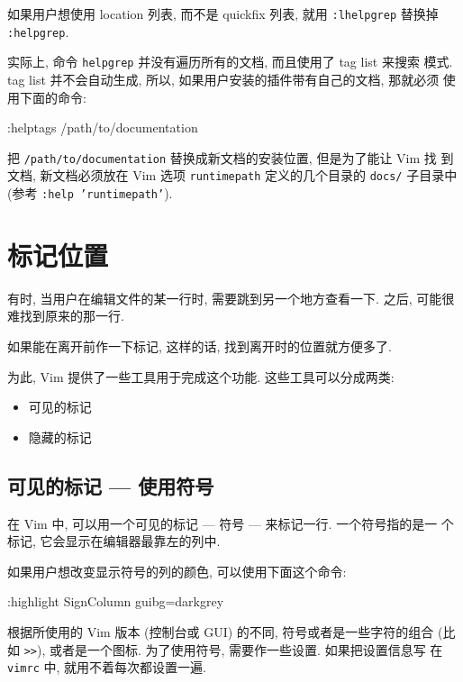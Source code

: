 \begin{warning}
    如果用户想使用 location 列表, 而不是 quickfix 列表, 就用 \texttt{:lhelpgrep}
    替换掉 \texttt{:helpgrep}.
\end{warning}

实际上, 命令 \texttt{helpgrep} 并没有遍历所有的文档, 而且使用了 tag list 来搜索
模式. tag list 并不会自动生成, 所以, 如果用户安装的插件带有自己的文档, 那就必须
使用下面的命令:
\begin{vimcode}
    :helptags /path/to/documentation
\end{vimcode}
把 \texttt{/path/to/documentation} 替换成新文档的安装位置, 但是为了能让 Vim 找
到文档, 新文档必须放在 Vim 选项 \texttt{runtimepath} 定义的几个目录的
\texttt{docs/} 子目录中 (参考 \texttt{:help 'runtimepath'}).

\section{标记位置}
\label{sec:x_marks_the_spot}

有时, 当用户在编辑文件的某一行时, 需要跳到另一个地方查看一下. 之后, 可能很
难找到原来的那一行.

如果能在离开前作一下标记, 这样的话, 找到离开时的位置就方便多了.

为此, Vim 提供了一些工具用于完成这个功能. 这些工具可以分成两类:
\begin{itemize}
    \item 可见的标记
    \item 隐藏的标记
\end{itemize}

\subsection{可见的标记 --- 使用符号}
\label{subsec:visible_markers_using_signs}

在 Vim 中, 可以用一个可见的标记 --- 符号 --- 来标记一行. 一个符号指的是一
个标记, 它会显示在编辑器最靠左的列中.

\begin{warning}
    如果用户想改变显示符号的列的颜色, 可以使用下面这个命令:
    \begin{vimcode}
    :highlight SignColumn guibg=darkgrey
    \end{vimcode}
\end{warning}

根据所使用的 Vim 版本 (控制台或 GUI) 的不同, 符号或者是一些字符的组合 (比如
\texttt{>>}), 或者是一个图标. 为了使用符号, 需要作一些设置. 如果把设置信息写
在 \texttt{vimrc} 中, 就用不着每次都设置一遍.

